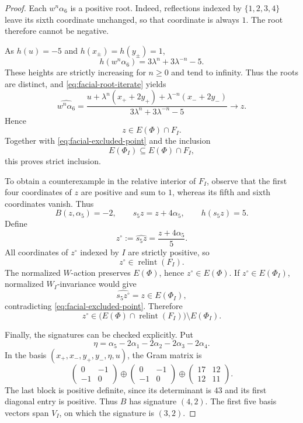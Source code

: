 \documentclass[11pt,reqno]{amsart}
\theoremstyle{plain}
\theoremstyle{definition}
\theoremstyle{remark}
\numberwithin{equation}{section}
\begin{document}
\begin{proof}
Each $w^n\alpha_6$ is a positive root.
Indeed, reflections indexed by $\{1,2,3,4\}$ leave its sixth
coordinate unchanged, so that coordinate is always $1$.
The root therefore cannot be negative.

As $h(u)=-5$ and $h(x_\pm)=h(y_\pm)=1$,
\[
h(w^n\alpha_6)=3\lambda^n+3\lambda^{-n}-5.
\]
These heights are strictly increasing for $n\ge0$ and tend to
infinity. Thus the roots are distinct, and
\eqref{eq:facial-root-iterate} yields
\[
\widehat{w^n\alpha_6}
=
\frac{
u+\lambda^n(x_++2y_+)+\lambda^{-n}(x_-+2y_-)
}{
3\lambda^n+3\lambda^{-n}-5
}
\longrightarrow z.
\]
Hence
\[
z\in E(\Phi)\cap F_I.
\]
Together with \eqref{eq:facial-excluded-point} and the inclusion
\[
E(\Phi_I)\subseteq E(\Phi)\cap F_I,
\]
this proves strict inclusion.

To obtain a counterexample in the relative interior of $F_I$,
observe that the first four coordinates of $z$ are positive
and sum to $1$, whereas its fifth and sixth coordinates vanish.
Thus
\[
B(z,\alpha_5)=-2,
\qquad
s_5z=z+4\alpha_5,
\qquad
h(s_5z)=5.
\]
Define
\begin{equation}\label{eq:facial-interior-counterexample}
z^\circ:=\widehat{s_5z}
=\frac{z+4\alpha_5}{5}.
\end{equation}
All coordinates of $z^\circ$ indexed by $I$ are strictly positive,
so
\[
z^\circ\in\operatorname{relint}(F_I).
\]
The normalized $W$-action preserves $E(\Phi)$, hence
$z^\circ\in E(\Phi)$.
If $z^\circ\in E(\Phi_I)$, normalized $W_I$-invariance would give
\[
\widehat{s_5z^\circ}=z\in E(\Phi_I),
\]
contradicting \eqref{eq:facial-excluded-point}.
Therefore
\[
z^\circ\in
\bigl(E(\Phi)\cap\operatorname{relint}(F_I)\bigr)
\setminus E(\Phi_I).
\]

Finally, the signatures can be checked explicitly.
Put
\[
\eta=\alpha_5-2\alpha_1-2\alpha_2-2\alpha_3-2\alpha_4.
\]
In the basis $(x_+,x_-,y_+,y_-,\eta,u)$, the Gram matrix is
\[
\begin{pmatrix}
0&-1\\
-1&0
\end{pmatrix}
\oplus
\begin{pmatrix}
0&-1\\
-1&0
\end{pmatrix}
\oplus
\begin{pmatrix}
17&12\\
12&11
\end{pmatrix}.
\]
The last block is positive definite, since its determinant is
$43$ and its first diagonal entry is positive.
Thus $B$ has signature $(4,2)$.
The first five basis vectors span $V_I$, on which the signature
is $(3,2)$.
\end{proof}
\end{document}
